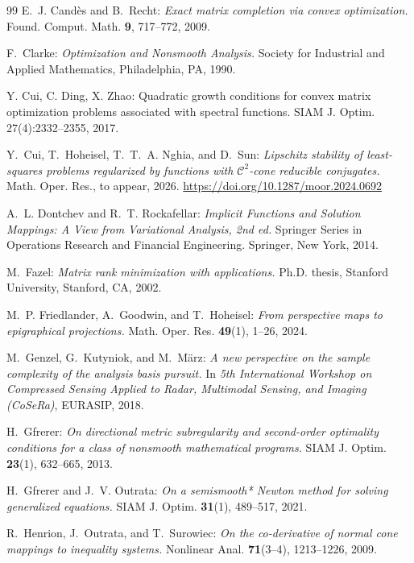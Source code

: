\documentclass[reqno]{amsart}
\numberwithin{equation}{section}
\begin{document}
\begin{thebibliography}{99}
{\sc E.~J. Cand\`es and B.~Recht:}
{\em Exact matrix completion via convex optimization.}
Found. Comput. Math. {\bf 9}, 717--772, 2009.

{\sc F.~Clarke:}
{\em Optimization and Nonsmooth Analysis.}
Society for Industrial and Applied Mathematics, Philadelphia, PA, 1990.

   {\sc Y. Cui, C. Ding, X. Zhao}: Quadratic growth conditions for convex matrix optimization problems associated with spectral functions. SIAM J. Optim.  27(4):2332--2355, 2017.

{\sc Y.~Cui, T.~Hoheisel, T.~T.~A. Nghia, and D.~Sun:}
{\em Lipschitz stability of least-squares problems regularized by functions with $\mathcal{C}^2$-cone reducible conjugates.}
Math. Oper. Res., to appear, 2026.
\url{https://doi.org/10.1287/moor.2024.0692}

{\sc A.~L. Dontchev and R.~T. Rockafellar:}
{\em Implicit Functions and Solution Mappings: A View from Variational Analysis, 2nd ed.}
Springer Series in Operations Research and Financial Engineering. Springer, New York, 2014.

{\sc M.~Fazel:}
{\em Matrix rank minimization with applications.}
Ph.D. thesis, Stanford University, Stanford, CA, 2002.

{\sc M.~P. Friedlander, A.~Goodwin, and T.~Hoheisel:}
{\em From perspective maps to epigraphical projections.}
Math. Oper. Res. {\bf 49}(1), 1--26, 2024.

{\sc M.~Genzel, G.~Kutyniok, and M.~M\"arz:}
{\em A new perspective on the sample complexity of the analysis basis pursuit.}
In {\em 5th International Workshop on Compressed Sensing Applied to Radar, Multimodal Sensing, and Imaging (CoSeRa)}, EURASIP, 2018.

{\sc H.~Gfrerer:}
{\em On directional metric subregularity and second-order optimality conditions for a class of nonsmooth mathematical programs.}
SIAM J. Optim. {\bf 23}(1), 632--665, 2013.

{\sc H.~Gfrerer and J.~V. Outrata:}
{\em On a semismooth* Newton method for solving generalized equations.}
SIAM J. Optim. {\bf 31}(1), 489--517, 2021.

{\sc R.~Henrion, J.~Outrata, and T.~Surowiec:}
{\em On the co-derivative of normal cone mappings to inequality systems.}
Nonlinear Anal. {\bf 71}(3--4), 1213--1226, 2009.


\end{thebibliography}
\end{document}

